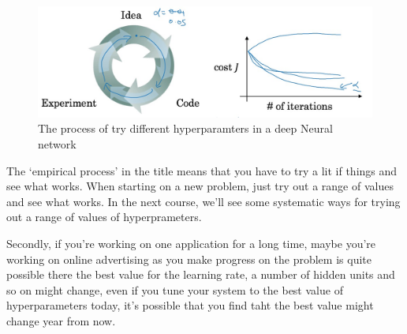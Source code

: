 \documentclass[UTF8]{article}
\begin{document}
\begin{figure}[htb]
    \centering
    \includegraphics[width=40em]{figures/hyperparameters}
    \caption{The process of try different hyperparamters in a deep Neural network}
    \label{fig:hyperparameters}
\end{figure}

The `empirical process' in the title means that you have to try a lit if things and see what works.
When starting on a new problem, just try out a range of values and see what works. In the next
course, we'll see some systematic ways for trying out a range of values of hyperprameters.

Secondly, if you're working on one application for a long time, maybe you're working on online
advertising as you make progress on the problem is quite possible there the best value for the
learning rate, a number of hidden units and so on might change, even if you tune your system to
the best value of hyperparameters today, it's possible that you find taht the best value might
change year from now.
\end{document}
